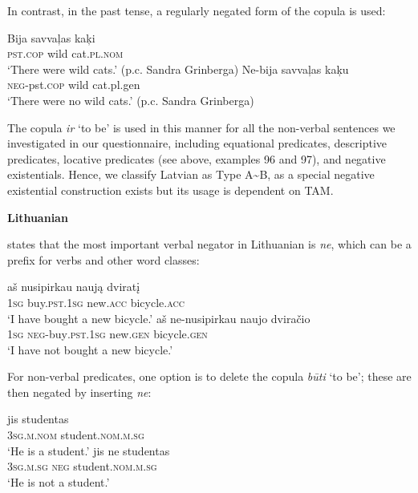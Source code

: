\documentclass[output=paper]{langsci/langscibook}
\begin{document}
\begin{unindented}
In contrast, in the past tense, a regularly negated form of the copula is used:
%
\begin{exe}\ex \begin{xlist}
\ex\gll Bija savvaļas kaķi \\
\textsc{pst.cop} wild cat.\textsc{pl.nom} \\
    \glt `There were wild cats.' (p.c. Sandra Grinberga)
\ex\gll Ne-bija savvaļas kaķu\\
\textsc{neg}-pst.\textsc{cop} wild cat.pl.gen\\
\glt `There were no wild cats.' (p.c. Sandra Grinberga)
    \end{xlist}\end{exe}

The copula \textit{ir} `to be' is used in this manner for all the non-verbal sentences we investigated in our questionnaire, including equational predicates, descriptive predicates, locative predicates (see above, examples 96 and 97), and negative existentials. Hence, we classify Latvian as Type A{\textasciitilde}B, as a special negative existential construction exists but its usage is dependent on TAM. 

\textbf{Lithuanian}

\citet[176--177]{Mathiassen1996} states that the most important verbal negator in Lithuanian is \textit{ne}, which can be a prefix for verbs and other word classes:
%
\begin{exe}\ex \gll aš nusipirkau naują dviratį \\
\textsc{1sg} buy.\textsc{pst.1sg} new.\textsc{acc} bicycle.\textsc{acc} \\
    \glt `I have bought a new bicycle.' \citep[185]{Mathiassen1996}
\ex \gll aš ne-nusipirkau naujo dviračio \\
\textsc{1sg} \textsc{neg}-buy\textsc{.pst.1sg} new.\textsc{gen} bicycle.\textsc{gen} \\
    \glt `I have not bought a new bicycle.' \citep[185]{Mathiassen1996}
    \end{exe}

For non-verbal predicates, one option is to delete the copula \textit{būti} `to be'; these are then negated by inserting \textit{ne}:
%
\begin{exe}\ex \gll jis studentas \\
\textsc{3sg.m.nom} student.\textsc{nom.m.sg} \\
    \glt `He is a student.' \citep[176]{Mathiassen1996}
\ex \gll jis ne studentas \\
\textsc{3sg.m.sg} \textsc{neg}  student.\textsc{nom.m.sg} \\
    \glt `He is not a student.' \citep[176]{Mathiassen1996}
    \end{exe}


\end{unindented}
\end{document}
